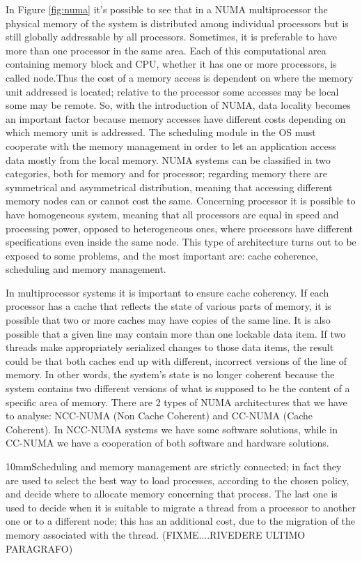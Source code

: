 \documentclass[a4paper,10pt]{article}
\begin{document}
\begin{multicols}{2}
In Figure \ref{fig:numa} it's possible to see that in a NUMA multiprocessor the physical memory of the system is distributed among individual processors but is still globally addressable by all processors. Sometimes, it is preferable to have more than one processor in the same area. Each of this computational area containing memory block and CPU, whether it has one or more processors, is called node.Thus the cost of a memory access is dependent on where the memory unit addressed is located; relative to the processor some accesses may be local some may be remote. So, with the introduction of NUMA, data locality becomes an important factor because memory accesses have different costs depending on which memory unit is addressed. The scheduling module in the OS must cooperate with the memory management in order to let an application access data mostly from the local memory. NUMA systems can be classified in two categories, both for memory and for processor; regarding memory there are symmetrical and asymmetrical distribution, meaning that accessing different memory nodes can or cannot cost the same. Concerning processor it is possible to have homogeneous system, meaning that all processors are equal in speed and processing power, opposed to heterogeneous ones, where processors have different specifications even inside the same node. This type of architecture turns out to be exposed to some problems, and the most important are: cache coherence, scheduling and memory management.\par
\parindent 10mm In multiprocessor systems it is important to ensure cache coherency. If each processor has a cache that reflects the state of various parts of memory, it is possible that two or more caches may have copies of the same line. It is also possible that a given line may contain more than one lockable data item. If two threads make appropriately serialized changes to those data items, the result could be that both caches end up with different, incorrect versions of the line of memory. In other words, the system's state is no longer coherent because the system contains two different versions of what is supposed to be the content of a specific area of memory. There are 2 types of NUMA architectures that we have to analyse: NCC-NUMA (Non Cache Coherent) and CC-NUMA (Cache Coherent). In NCC-NUMA systems we have some software solutions, while in CC-NUMA we have a cooperation of both software and hardware solutions.\par 
\parindent 10mmScheduling and memory management are strictly connected; in fact they are used to select the best way to load processes, according to the chosen policy, and decide where to allocate memory concerning that process. The last one is used to decide when it is suitable to migrate a thread from a processor to another one or to a different node; this has an additional cost, due to the migration of the memory associated with the thread. (FIXME....RIVEDERE ULTIMO PARAGRAFO)



\end{multicols}
\end{document}
